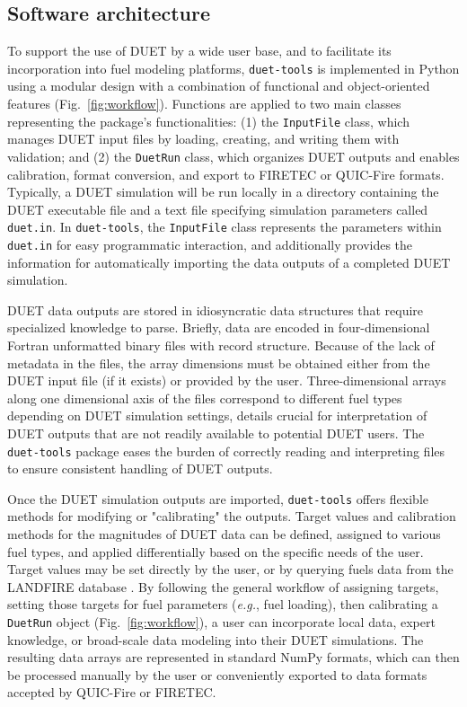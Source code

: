 \documentclass[preprint,12pt,a4paper]{elsarticle}
\begin{document}
\subsection{Software architecture}
To support the use of DUET by a wide user base, and to facilitate its incorporation into fuel modeling platforms, \texttt{duet-tools} is implemented in Python using a modular design with a combination of functional and object-oriented features (Fig.~\ref{fig:workflow}).
Functions are applied to two main classes representing the package’s functionalities: (1) the \texttt{InputFile} class, which manages DUET input files by loading, creating, and writing them with validation; and (2) the \texttt{DuetRun} class, which organizes DUET outputs and enables calibration, format conversion, and export to FIRETEC or QUIC-Fire formats.
Typically, a DUET simulation will be run locally in a directory containing the DUET executable file and a text file specifying simulation parameters called \texttt{duet.in}.
In \texttt{duet-tools}, the \texttt{InputFile} class represents the parameters within \texttt{duet.in} for easy programmatic interaction, and additionally provides the information for automatically importing the data outputs of a completed DUET simulation.\newline

DUET data outputs are stored in idiosyncratic data structures that require specialized knowledge to parse.
Briefly, data are encoded in four-dimensional Fortran unformatted binary files with record structure.
Because of the lack of metadata in the files, the array dimensions must be obtained either from the DUET input file (if it exists) or provided by the user.
Three-dimensional arrays along one dimensional axis of the files correspond to different fuel types depending on DUET simulation settings, details crucial for interpretation of DUET outputs that are not readily available to potential DUET users.
The \texttt{duet-tools} package eases the burden of correctly reading and interpreting files to ensure consistent handling of DUET outputs.\newline

Once the DUET simulation outputs are imported, \texttt{duet-tools} offers flexible methods for modifying or "calibrating" the outputs.
Target values and calibration methods for the magnitudes of DUET data can be defined, assigned to various fuel types, and applied differentially based on the specific needs of the user.
Target values may be set directly by the user, or by querying fuels data from the LANDFIRE database \cite{la_puma_landfire_2023}.
By following the general workflow of assigning targets, setting those targets for fuel parameters (\textit{e.g.}, fuel loading), then calibrating a \texttt{DuetRun} object (Fig.~\ref{fig:workflow}), a user can incorporate local data, expert knowledge, or broad-scale data modeling into their DUET simulations.
The resulting data arrays are represented in standard NumPy \cite{harris2020array} formats, which can then be processed manually by the user or conveniently exported to data formats accepted by QUIC-Fire or FIRETEC.\newline
\end{document}
